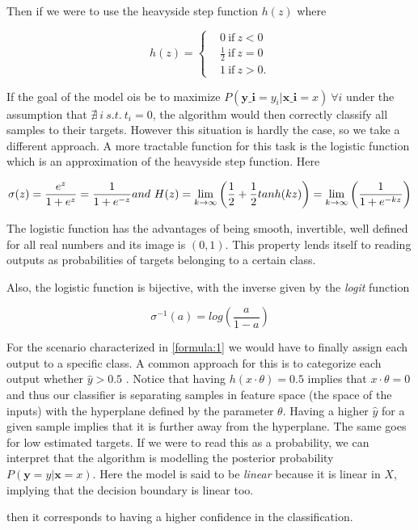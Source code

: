 Then if we were to use the heavyside step function $h(z)$  where

\[
    h(z) =
      \begin{cases}
        &0 \ \mbox{if} \ z<0 \\
        &\frac{1}{2} \ \mbox{if} \  z=0 \\
        &1 \ \mbox{if} \  z>0.
      \end{cases}
    \]

If the goal of the model ois be to maximize $P(\textbf{y_i} = y_i | \textbf{x_i} = x) \ \forall i$
under the assumption that $\nexists\  i \  s.t. \ t_i = 0$, the algorithm would then correctly classify all samples to their targets. However this situation is hardly the case, so we take a different approach. A more tractable function for this task is the logistic function which is an approximation of the heavyside step function. Here  

\begin{equation} \label{eq:logisticFunction}
\sigma(z)  = \frac{e^{z}}{1 + e^{z}} = \frac{1}{1 + e^{-z}}  \\
and \  H(z) = \lim_{k \to \infty} \left(\frac{1}{2} + \frac{1}{2}tanh(kz) \right) = \lim_{k \to \infty} \left(\frac{1}{1+e^{-kz}} \right)  
\end{equation}

The logistic function has the advantages of being smooth, invertible, well defined for all real numbers and its image is $(0,1)$. This property lends itself to reading outputs as probabilities of targets belonging to a certain class. 

Also, the logistic function is bijective, with the inverse given by the \textit{logit} function 

\begin{equation} \label{eq:logitFunction}
\sigma^{-1}(a)  = log( \frac{a}{1 -a})    
\end{equation}

For the scenario characterized in \ref{formula:1} we would have to finally assign each output to a specific class. A common approach for this is to categorize each output whether $\hat{y} > 0.5$ \label{formula:logitThreshold}. Notice that having $h(x \cdot \theta) = 0.5$ implies that $x \cdot  \theta = 0$ and thus our classifier is separating samples in feature space (the space of the inputs) with the hyperplane defined by the parameter $\theta$. Having a higher $\hat{y}$ for a given sample implies that it is further away from the hyperplane. The same goes for low estimated targets. If we were to read this as a probability, we can interpret that the algorithm is modelling the posterior probability $P(\textbf{y} = y | \textbf{x} = x)$. Here the model is said to be \textit{linear} because it is linear in $X$, implying that the decision boundary is linear too. 



then it corresponds to having a higher confidence in the classification.


